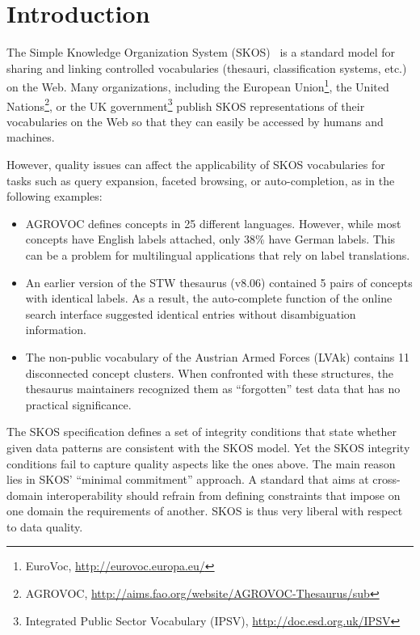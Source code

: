 
\section{Introduction}\label{sec:introduction}


The Simple Knowledge Organization System (SKOS)~\cite{SkosReference2008} is a standard model for sharing and linking controlled vocabularies (thesauri, classification systems, etc.) on the Web. Many organizations, including the European Union\footnote{EuroVoc, \url{http://eurovoc.europa.eu/}}, the United Nations\footnote{AGROVOC, \url{http://aims.fao.org/website/AGROVOC-Thesaurus/sub}}, or the UK government\footnote{Integrated Public Sector Vocabulary (IPSV), \url{http://doc.esd.org.uk/IPSV}} publish SKOS representations of their vocabularies on the Web so that they can easily be accessed by humans and machines.

However, quality issues can affect the applicability of SKOS vocabularies for tasks such as query expansion, faceted browsing, or auto-completion, as in the following examples: 

\begin{itemize}

	\item AGROVOC defines concepts in 25 different languages. However, while most concepts have English labels attached, only 38\% have German labels. This can be a problem for multilingual applications that rely on label translations.

	\item An earlier version of the STW thesaurus (v8.06) contained 5 pairs of concepts with identical labels. As a result, the auto-complete function of the online search interface suggested identical entries without disambiguation information.

	\item The non-public vocabulary of the Austrian Armed Forces (LVAk) contains 11 disconnected concept clusters. When confronted with these structures, the thesaurus maintainers recognized them as ``forgotten'' test data that has no practical significance.
	
\end{itemize}


The SKOS specification defines a set of integrity conditions that state whether given data patterns are consistent with the SKOS model. Yet the SKOS integrity conditions fail to capture quality aspects like the ones above. The main reason lies in SKOS' ``minimal commitment'' approach. A standard that aims at cross-domain interoperability should refrain from defining constraints that impose on one domain the requirements of another. SKOS is thus very liberal with respect to data quality.


